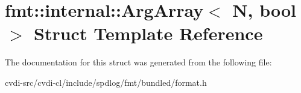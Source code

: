 \hypertarget{structfmt_1_1internal_1_1ArgArray}{}\section{fmt\+:\+:internal\+:\+:Arg\+Array$<$ N, bool $>$ Struct Template Reference}
\label{structfmt_1_1internal_1_1ArgArray}


The documentation for this struct was generated from the following file\+:\begin{DoxyCompactItemize}
\item 
cvdi-\/src/cvdi-\/cl/include/spdlog/fmt/bundled/format.\+h\end{DoxyCompactItemize}
